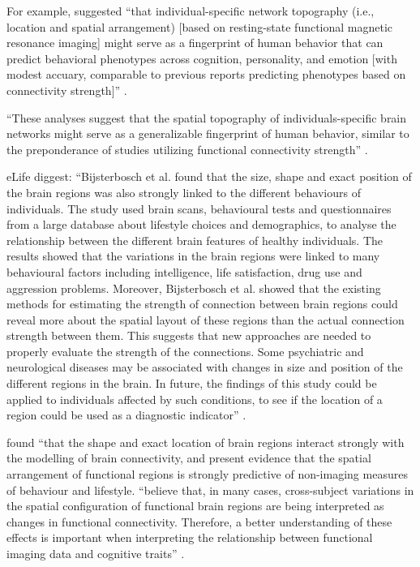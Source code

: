 %
For example, \citet{kong2019spatial} suggested ``that individual-specific network
topography (i.e., location and spatial arrangement) [based on resting-state
functional magnetic resonance imaging] might serve as a fingerprint of human
behavior that can predict behavioral phenotypes across cognition, personality,
and emotion [with modest accuary, comparable to previous reports predicting
phenotypes based on connectivity strength]'' \citep{kong2019spatial}.

%
``These analyses suggest that the spatial topography of individuals-specific
brain networks might serve as a generalizable fingerprint of human behavior,
similar to the preponderance of studies utilizing functional connectivity
strength'' \citet{kong2019spatial}.


eLife diggest: ``Bijsterbosch et al. found that the size, shape and exact
position of the brain regions was also strongly linked to the different
behaviours of individuals. The study used brain scans, behavioural tests and
questionnaires from a large database about lifestyle choices and demographics,
to analyse the relationship between the different brain features of healthy
individuals.
%
The results showed that the variations in the brain regions were linked to many
behavioural factors including intelligence, life satisfaction, drug use and
aggression problems.
%
Moreover, Bijsterbosch et al. showed that the existing methods for estimating
the strength of connection between brain regions could reveal more about the
spatial layout of these regions than the actual connection strength between
them.
%
This suggests that new approaches are needed to properly evaluate the strength
of the connections.
%
Some psychiatric and neurological diseases may be associated with changes in
size and position of the different regions in the brain.
%
In future, the findings of this study could be applied to individuals affected
by such conditions, to see if the location of a region could be used as a
diagnostic indicator'' \citep{bijsterbosch2018relationship}.

\citep{bijsterbosch2018relationship} found ``that the shape and exact location
of brain regions interact strongly with the modelling of brain connectivity, and
present evidence that the spatial arrangement of functional regions is strongly
predictive of non-imaging measures of behaviour and lifestyle.
%
\citet{bijsterbosch2018relationship} ``believe that, in many cases,
cross-subject variations in the spatial configuration of functional brain
regions are being interpreted as changes in functional connectivity.
%
Therefore, a better understanding of these effects is important when
interpreting the relationship between functional imaging data and cognitive
traits'' \citep{bijsterbosch2018relationship}.

